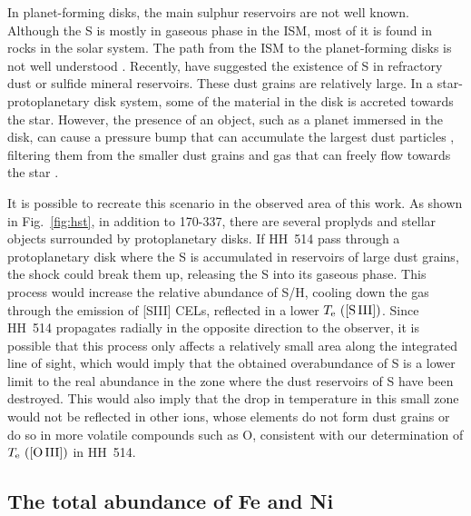 \documentclass[fleqn,usenatbib]{mnras}
\begin{document}
In planet-forming disks, the main sulphur reservoirs are not well known. Although the S is mostly in gaseous phase in the ISM, most of it is found in rocks in the solar system. The path from the ISM to the planet-forming disks is not well understood \citep[][]{Kama19}. Recently, \citet{Kama19} have suggested the existence of S in refractory dust or sulfide mineral reservoirs. These dust grains are relatively large. In a star-protoplanetary disk system, some of the material in the disk is accreted towards the star. However, the presence of an object, such as a planet immersed in the disk, can cause a pressure bump that can accumulate the largest dust particles \citep{Pinilla2012,Birnstiel16}, filtering them from the smaller dust grains and gas that can freely flow towards the star \citep[][]{Kama19}.

It is possible to recreate this scenario in the observed area of this work. As shown in Fig.~\ref{fig:hst}, in addition to 170-337, there are several proplyds and stellar objects surrounded by protoplanetary disks. If HH~514 pass through a protoplanetary disk where the S is accumulated in reservoirs of large dust grains, the shock could break them up, releasing the S into its gaseous phase. This process would increase the relative abundance of S/H, cooling down the gas through the emission of [S\thinspace III] CELs, reflected in a lower $T_{\rm e} \text{ ([S\thinspace III])}$. Since HH~514 propagates radially in the opposite direction to the observer, it is possible that this process only affects a relatively small area along the integrated line of sight, which would imply that the obtained overabundance of S is a lower limit to the real abundance in the zone where the dust reservoirs of S have been destroyed. This would also imply that the drop in temperature in this small zone would not be reflected in other ions, whose elements do not form dust grains or do so in more volatile compounds such as O, consistent with our determination of $T_{\rm e} \text{ ([O\thinspace III])}$ in HH~514.


\subsection{The total abundance of Fe and Ni}
\label{subsec:totalFeandNi}
\end{document}
